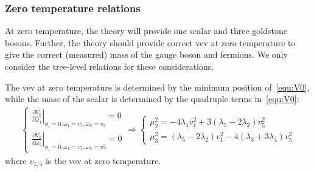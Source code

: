 \documentclass[12pt]{article}
\begin{document}
\subsubsection{Zero temperature relations}

At zero temperature, the theory will provide one scalar and three goldstone bosons. Further, the theory should provide correct vev at zero temperature to give the correct (measured) mass of the gauge boson and fermions. We only consider the tree-level relations for these considerations.

The vev at zero temperature is determined by the minimum position of~\autoref{equ:V0}, while the mass of the scalar is determined by the quadruple terms in~\autoref{equ:V0}:
\begin{align}
    \label{equ:stationary_condition}
    \begin{cases}
    \left.\frac{\partial V_0}{\partial \omega_1}\right|_{\phi_i=0,\omega_1 = v_1,\omega_5=v_5} = 0 \\
    \left.\frac{\partial V_0}{\partial \omega_5}\right|_{\phi_i=0,\omega_1 = v_1,\omega_5=v5} = 0
    \end{cases} \Rightarrow \begin{cases}
    \mu_2^2 = -4\lambda_1v_1^2+3(\lambda_5-2\lambda_2)v_5^2\\
    \mu_3^2 = (\lambda_5-2\lambda_2)v_1^2-4(\lambda_3+3\lambda_4)v_5^2
    \end{cases}
\end{align}
where $v_{1,5}$ is the vev at zero temperature.
\end{document}
